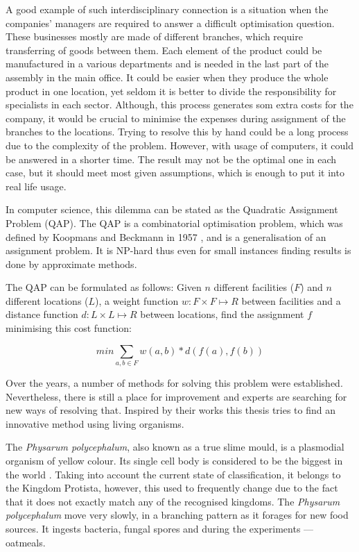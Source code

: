 \documentclass[english,a4paper,twoside]{ppfcmthesis}
\begin{document}
A good example of such interdisciplinary connection is a situation when the companies' managers are required to answer a difficult optimisation question. These businesses mostly are made of different branches, which require transferring of goods between them. Each element of the product could be manufactured in a various departments and is needed in the last part of the assembly in the main office. It could be easier when they produce the whole product in one location, yet seldom it is better to divide the responsibility for specialists in each sector. Although, this process generates som extra costs for the company, it would be crucial to minimise the expenses during assignment of the branches to the locations. Trying to resolve this by hand could be a long process due to the complexity of the problem. However, with usage of computers, it could be answered in a shorter time. The result may not be the optimal one in each case, but it should meet most given assumptions, which is enough to put it into real life usage.

In computer science, this dilemma can be stated as the Quadratic Assignment Problem (QAP).  The QAP is a combinatorial optimisation problem, which was defined by Koopmans and Beckmann in 1957 \cite{koopmans-beckmann1957}, and is a generalisation of an assignment problem. It is NP-hard thus even for small instances finding results is done by approximate methods.

The QAP can be formulated as follows: Given $ n $ different facilities ($F$) and $ n $ different locations ($L$), a weight function $ w: F \times F \mapsto R $ between facilities and a distance function $ d: L \times L \mapsto R $ between locations, find the assignment $f$ minimising this cost function:

\begin{equation}
min \sum_{a, b \in F} w(a, b) * d( f(a), f(b))
\end{equation}

Over the years, a number of methods for solving this problem were established. Nevertheless, there is still a place for improvement and experts are searching for new ways of resolving that. Inspired by their works this thesis tries to find an innovative method using living organisms.

The \textit{Physarum polycephalum}, also known as a true slime mould, is a plasmodial organism of yellow colour. Its single cell body is considered to be the biggest in the world \cite{stephenson1994myxomycetes}. Taking into account the current state of classification, it belongs to the Kingdom Protista, however, this used to frequently change due to the fact that it does not exactly match any of the recognised kingdoms. The \textit{Physarum polycephalum} move very slowly, in a branching pattern as it forages for new food sources. It ingests bacteria, fungal spores and during the experiments --- oatmeals.
\end{document}
